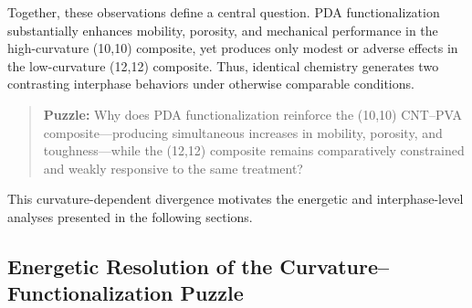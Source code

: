 \documentclass[journal=jacsat,manuscript=article]{achemso}
\begin{document}
{Together, these observations define a central question.  
PDA functionalization substantially enhances mobility, porosity, and mechanical performance in the high-curvature (10,10) composite, yet produces only modest or adverse effects in the low-curvature (12,12) composite. Thus, identical chemistry generates two contrasting interphase behaviors under otherwise comparable conditions.

\begin{quote}
\textbf{Puzzle:}  
Why does PDA functionalization reinforce the (10,10) CNT–PVA composite—producing simultaneous increases in mobility, porosity, and toughness—while the (12,12) composite remains comparatively constrained and weakly responsive to the same treatment?
\end{quote}

This curvature-dependent divergence motivates the energetic and interphase-level analyses presented in the following sections.


\subsection{Energetic Resolution of the Curvature–Functionalization Puzzle}

}
\end{document}
